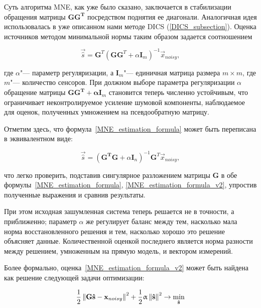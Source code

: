 Суть алгоритма MNE, как уже было сказано, заключается в стабилизации обращения
матрицы $\mathbf{GG^T}$ посредством поднятия ее диагонали. Аналогичная идея
использовалась в уже описанном нами методе DICS (\ref{DICS_subsection}).
Оценка источников методом минимальной нормы таким образом задается соотношением

\begin{equation}
    \vec{\hat{s}} = \mathbf{G}^T(\mathbf{GG}^T + \alpha \mathbf{I}_m)^{-1}\vec{x}_{noisy},
    \label{MNE_estimation_formula}
\end{equation}

где $\alpha$"--- параметр регуляризации, а $\mathbf{I}_m$"--- единичная матрица
размера $m \times m$, где $m$"--- количество сенсоров. При должном выборе параметра
регуляризации $\alpha$ обращение матрицы $\mathbf{GG^T + \alpha I}_m$
становится теперь численно устойчивым, что ограничивает неконтролируемое
усиление шумовой компоненты, наблюдаемое для оценок, полученных умножением на
псевдообратную матрицу.

Отметим здесь, что формула~\ref{MNE_estimation_formula} может быть переписана в
эквивалентном виде:

\begin{equation}
    \vec{\hat{s}} = (\mathbf{G^TG} + \alpha \mathbf{I}_n)^{-1}\mathbf{G}^T\vec{x}_{noisy},
    \label{MNE_estimation_formula_v2}
\end{equation}

что легко проверить, подставив сингулярное разложением матрицы $\mathbf{G}$ в
обе формулы~\ref{MNE_estimation_formula}, \ref{MNE_estimation_formula_v2},
упростив полученные выражения и сравнив результаты.

При этом исходная зашумленная система теперь решается не в точности, а
приближенно; параметр $\alpha$ же регулирует баланс между
тем, насколько мала норма восстановленного решения и тем, насколько
хорошо это решение объясняет данные. Количественной оценкой последнего
является норма разности между решением, умноженным на прямую модель,
и вектором измерений.

Более формально, оценка~\ref{MNE_estimation_formula_v2} может быть найдена
как решение следующей задачи оптимизации:

\begin{equation}
    \frac{1}{2}\left\lVert\mathbf{G\hat{s} - x}_{noisy}\right\rVert^2 + \frac{1}{2}\upalpha\left\lVert\mathbf{\hat{s}}\right\rVert^2 \rightarrow \underset{\mathbf{\hat{s}}}{\min}
    \label{MNE_optimization_crit}
\end{equation}

